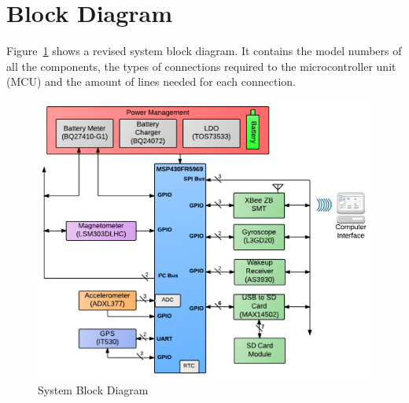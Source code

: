 \section{Block Diagram}

Figure~\ref{fig:blockDiagram} shows a revised system block diagram. It contains the model numbers of all the components, the types of connections required to the microcontroller unit (MCU) and the amount of lines needed for each connection.

\begin{figure}[H]
\centering
	\includegraphics[width=\textwidth]{img/blockDiagram}
	\caption{System Block Diagram \label{fig:blockDiagram}}
\end{figure}